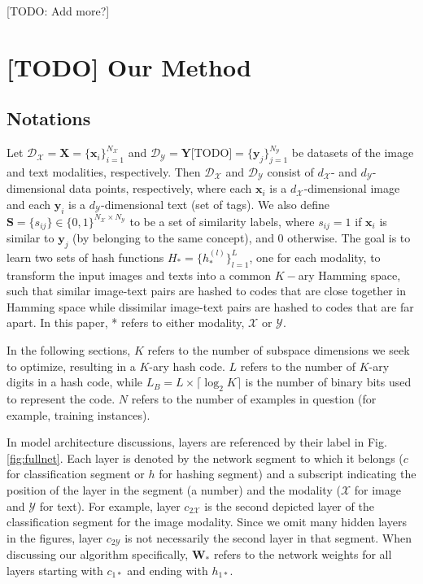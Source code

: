 \documentclass[letterpaper]{article}
\newcommand{\X}{\mathbf{X}}
\newcommand{\Y}{\mathbf{Y}}
\newcommand{\xii}{\mathbf{x}_i}
\newcommand{\yj}{\mathbf{y}_j}
\begin{document}
[TODO: Add more?]

\section{[TODO] Our Method}

\subsection{Notations}

Let $ \mathcal{D}_\mathcal{X} = \X = \{ \xii \}_{i=1}^{N_\mathcal{X}} $ and $ \mathcal{D}_\mathcal{Y} = \Y \text{[TODO]} = \{ \yj \}_{j=1}^{N_\mathcal{Y}} $ be datasets of the image and text modalities, respectively. Then $ \mathcal{D}_\mathcal{X} $ and $ \mathcal{D}_\mathcal{Y} $ consist of $ d_\mathcal{X} $- and $ d_\mathcal{Y} $-dimensional data points, respectively, where each $ \xii $ is a $ d_\mathcal{X} $-dimensional image and each $ \mathbf{y}_i $ is a $ d_\mathcal{Y} $-dimensional text (set of tags). We also define $ \mathbf{S} = \{s_{ij}\} \in \{0,1\}^{N_\mathcal{X} \times N_\mathcal{Y}} $ to be a set of similarity labels, where $ s_{ij} = 1 $ if $ \xii $ is similar to $ \yj $ (by belonging to the same concept), and $ 0 $ otherwise. The goal is to learn two sets of hash functions $ H_* = \{h_*^{(l)}\}_{l=1}^L $, one for each modality, to transform the input images and texts into a common $K-$ary Hamming space, such that similar image-text pairs are hashed to codes that are close together in Hamming space while dissimilar image-text pairs are hashed to codes that are far apart. In this paper, * refers to either modality, $ \mathcal{X} $ or $ \mathcal{Y} $.

In the following sections, $ K $ refers to the number of subspace dimensions we seek to optimize, resulting in a $K$-ary hash code. $ L $ refers to the number of $K$-ary digits in a hash code, while $ L_B = L \times \lceil\log_{2}K\rceil $ is  the number of binary bits used to represent the code. $ N $ refers to the number of examples in question (for example, training instances).

In model architecture discussions, layers are referenced by their label in Fig. \ref{fig:fullnet}. Each layer is denoted by the network segment to which it belongs ($ c $ for classification segment or $ h $ for hashing segment) and a subscript indicating the position of the layer in the segment (a number) and the modality ($ \mathcal{X} $ for image and $ \mathcal{Y} $ for text). For example, layer $ c_{2\mathcal{X}} $ is the second depicted layer of the classification segment for the image modality. Since we omit many hidden layers in the figures, layer $ c_{2\mathcal{Y}} $ is not necessarily the second layer in that segment. When discussing our algorithm specifically, $ \mathbf{W_*} $ refers to the network weights for all layers starting with $ c_{1*} $ and ending with $ h_{1*} $.
\end{document}

